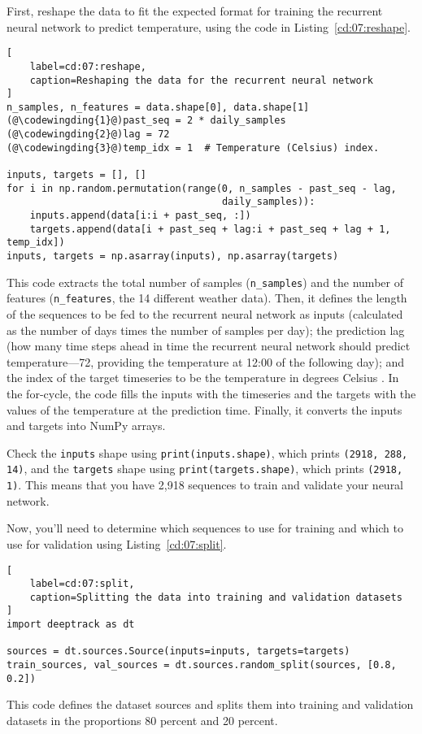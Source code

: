 First, reshape the data to fit the expected format for training the recurrent neural network to predict temperature, using the code in Listing~\ref{cd:07:reshape}.
\begin{lstlisting}[
    label=cd:07:reshape,
    caption=Reshaping the data for the recurrent neural network
]
n_samples, n_features = data.shape[0], data.shape[1]
(@\codewingding{1}@)past_seq = 2 * daily_samples
(@\codewingding{2}@)lag = 72
(@\codewingding{3}@)temp_idx = 1  # Temperature (Celsius) index.

inputs, targets = [], []
for i in np.random.permutation(range(0, n_samples - past_seq - lag, 
                                     daily_samples)):
    inputs.append(data[i:i + past_seq, :])
    targets.append(data[i + past_seq + lag:i + past_seq + lag + 1, temp_idx])
inputs, targets = np.asarray(inputs), np.asarray(targets)
\end{lstlisting}
This code extracts the total number of samples (\lstinline{n_samples}) and the number of features (\lstinline{n_features}, the 14 different weather data).
Then, it defines the length of the sequences to be fed to the recurrent neural network as inputs  (calculated as the number of days times the number of samples per day); the prediction lag  (how many time steps ahead in time the recurrent neural network should predict temperature---72, providing the temperature at 12:00 of the following day); and the index of the target timeseries to be the temperature in degrees Celsius .
In the for-cycle, the code fills the inputs with the timeseries and the targets with the values of the temperature at the prediction time. 
Finally, it converts the inputs and targets into NumPy arrays.

Check the \lstinline{inputs} shape using \lstinline{print(inputs.shape)}, which prints \lstinline{(2918, 288, 14)}, and the \lstinline{targets} shape using \lstinline{print(targets.shape)}, which prints
\lstinline{(2918, 1)}. This means that you have 2,918 sequences to train and validate your neural network.

Now, you'll need to determine which sequences to use for training and which to use for validation using Listing~\ref{cd:07:split}.  
\begin{lstlisting}[
    label=cd:07:split,
    caption=Splitting the data into training and validation datasets
]
import deeptrack as dt

sources = dt.sources.Source(inputs=inputs, targets=targets)
train_sources, val_sources = dt.sources.random_split(sources, [0.8, 0.2])
\end{lstlisting}
This code defines the dataset sources and splits them into training and validation datasets in the proportions 80 percent and 20 percent.

